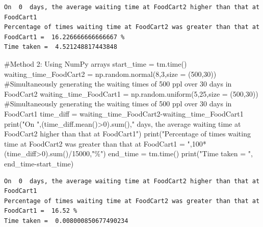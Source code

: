 \documentclass[
  letterpaper,
  DIV=11,
  numbers=noendperiod]{scrreprt}
\newenvironment{Shaded}{\begin{snugshade}}{\end{snugshade}}
\newcommand{\BuiltInTok}[1]{\textcolor[rgb]{0.00,0.23,0.31}{#1}}
\newcommand{\CommentTok}[1]{\textcolor[rgb]{0.37,0.37,0.37}{#1}}
\newcommand{\DecValTok}[1]{\textcolor[rgb]{0.68,0.00,0.00}{#1}}
\newcommand{\NormalTok}[1]{\textcolor[rgb]{0.00,0.23,0.31}{#1}}
\newcommand{\OperatorTok}[1]{\textcolor[rgb]{0.37,0.37,0.37}{#1}}
\newcommand{\StringTok}[1]{\textcolor[rgb]{0.13,0.47,0.30}{#1}}
\begin{document}
\begin{verbatim}
On  0  days, the average waiting time at FoodCart2 higher than that at FoodCart1
Percentage of times waiting time at FoodCart2 was greater than that at FoodCart1 =  16.226666666666667 %
Time taken =  4.521248817443848
\end{verbatim}

\begin{Shaded}
\begin{Highlighting}[]
\CommentTok{\#Method 2: Using NumPy arrays}
\NormalTok{start\_time }\OperatorTok{=}\NormalTok{ tm.time()}
\NormalTok{waiting\_time\_FoodCart2 }\OperatorTok{=}\NormalTok{ np.random.normal(}\DecValTok{8}\NormalTok{,}\DecValTok{3}\NormalTok{,size }\OperatorTok{=}\NormalTok{ (}\DecValTok{500}\NormalTok{,}\DecValTok{30}\NormalTok{)) }\CommentTok{\#Simultaneously generating the waiting times of 500 ppl over 30 days in FoodCart2}
\NormalTok{waiting\_time\_FoodCart1 }\OperatorTok{=}\NormalTok{ np.random.uniform(}\DecValTok{5}\NormalTok{,}\DecValTok{25}\NormalTok{,size }\OperatorTok{=}\NormalTok{ (}\DecValTok{500}\NormalTok{,}\DecValTok{30}\NormalTok{)) }\CommentTok{\#Simultaneously generating the waiting times of 500 ppl over 30 days in FoodCart1}
\NormalTok{time\_diff }\OperatorTok{=}\NormalTok{ waiting\_time\_FoodCart2}\OperatorTok{{-}}\NormalTok{waiting\_time\_FoodCart1}
\BuiltInTok{print}\NormalTok{(}\StringTok{"On "}\NormalTok{,(time\_diff.mean()}\OperatorTok{\textgreater{}}\DecValTok{0}\NormalTok{).}\BuiltInTok{sum}\NormalTok{(),}\StringTok{" days, the average waiting time at FoodCart2 higher than that at FoodCart1"}\NormalTok{)}
\BuiltInTok{print}\NormalTok{(}\StringTok{"Percentage of times waiting time at FoodCart2 was greater than that at FoodCart1 = "}\NormalTok{,}\DecValTok{100}\OperatorTok{*}\NormalTok{(time\_diff}\OperatorTok{\textgreater{}}\DecValTok{0}\NormalTok{).}\BuiltInTok{sum}\NormalTok{()}\OperatorTok{/}\DecValTok{15000}\NormalTok{,}\StringTok{"\%"}\NormalTok{)}
\NormalTok{end\_time }\OperatorTok{=}\NormalTok{ tm.time()}
\BuiltInTok{print}\NormalTok{(}\StringTok{"Time taken = "}\NormalTok{, end\_time}\OperatorTok{{-}}\NormalTok{start\_time)}
\end{Highlighting}
\end{Shaded}

\begin{verbatim}
On  0  days, the average waiting time at FoodCart2 higher than that at FoodCart1
Percentage of times waiting time at FoodCart2 was greater than that at FoodCart1 =  16.52 %
Time taken =  0.008000850677490234
\end{verbatim}
\end{document}
